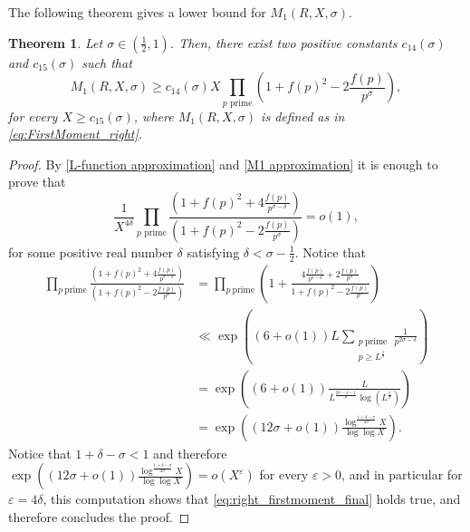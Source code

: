 \documentclass[10pt,a4paper]{amsart}
\theoremstyle{plain}
\newtheorem{theorem}{Theorem}[section]
\theoremstyle{definition}
\theoremstyle{remark}
\begin{document}
The following theorem gives a lower bound for $M_1(R,X,\sigma)$.

\begin{theorem}\label{M1alpha}
Let $\sigma \in \left( \frac{1}{2},1 \right)$. Then, there exist two positive constants $c_{14}(\sigma)$ and $c_{15}(\sigma)$ such that
\begin{equation*}
M_1(R,X,\sigma)
\geq c_{14}(\sigma) X\prod_{p\text{ prime}}\left(1+f(p)^2-2\frac{f(p)}{p^{\sigma}}\right),
\end{equation*}
for every $X \geq c_{15}(\sigma)$, where $M_1(R,X,\sigma)$ is defined as in \eqref{eq:FirstMoment_right}.
\end{theorem}
\begin{proof}
By \cref{L-function approximation} and \cref{M1 approximation} it is enough to prove that
\begin{equation} \label{eq:right_firstmoment_final}
    \frac{1}{X^{4\delta}}\prod_{p\text{ prime}}\frac{\left(1+f(p)^2+4\frac{f(p)}{p^{\sigma-\delta}}\right)}{\left(1+f(p)^2-2\frac{f(p)}{p^{\sigma}}\right)}=o(1),
\end{equation}
for some positive real number $\delta$ satisfying $\delta<\sigma-\frac{1}{2}$.
Notice that 
\begin{equation}\label{asymM1}
\begin{aligned}
\prod_{p \ \text{prime}} \frac{\left(1+f(p)^2+4\frac{f(p)}{p^{\sigma-\delta}}\right)}{\left(1+f(p)^2-2\frac{f(p)}{p^{\sigma}}\right)}
&=\prod_{p \ \text{prime}}\left(1+\frac{4\frac{f(p)}{p^{\sigma-\delta}}+2\frac{f(p)}{p^\sigma}}{1+f(p)^2-2\frac{f(p)}{p^{\sigma}}}\right) \\
&\ll \exp\left((6+o(1))L\sum_{\substack{p \ \text{prime} \\ p\geq L^{\frac{1}{\sigma}}}}\frac{1}{p^{2\sigma-\delta}}\right) \\ &= \exp\left((6+o(1))\frac{L}{ L^{\frac{2\sigma-\delta-1}{\sigma}}\log( L^{\frac{1}{\sigma}})}\right)\\ &=\exp\left(\left(12\sigma+o(1)\right)\frac{\log^{\frac{1+\delta-\sigma}{2\sigma}} X}{\log\log X}\right).
\end{aligned}
\end{equation}
Notice that $1+\delta-\sigma<1$ and therefore $\exp\left(\left(12\sigma+o(1)\right)\frac{\log^{\frac{1+\delta-\sigma}{2\sigma}} X}{\log\log X}\right) = o(X^{\varepsilon})$ for every $\varepsilon>0$, and in particular for $\varepsilon=4\delta$, this computation shows that \eqref{eq:right_firstmoment_final} holds true, and therefore concludes the proof.
\end{proof}
\end{document}
